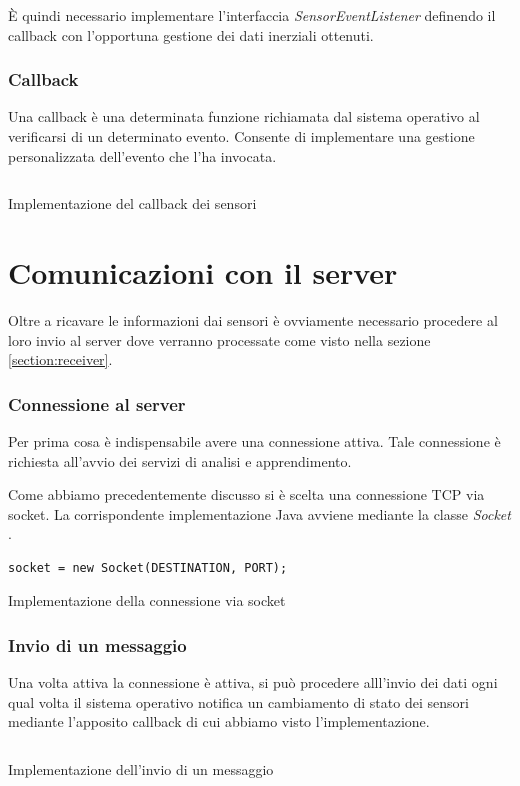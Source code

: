 È quindi necessario implementare l'interfaccia \textit{SensorEventListener} \cite{sensor_listener} definendo il 
callback con l'opportuna gestione dei dati inerziali ottenuti.

\subsubsection{Callback}
Una callback è una determinata funzione richiamata dal sistema operativo al verificarsi di un determinato evento.
Consente di implementare una gestione personalizzata dell'evento che l'ha invocata.

\begin{listing}[H] 
    \inputminted[frame=single,framesep=10pt]{java}{assets/snippets/app/sensors.java}
    \caption{Implementazione del callback dei sensori}
    \label{listing:sensor-event-callback}
\end{listing}

\newpage
\section{Comunicazioni con il server}
Oltre a ricavare le informazioni dai sensori è ovviamente necessario procedere al loro invio al server  
dove verranno processate come visto nella sezione \ref{section:receiver}.
\subsubsection{Connessione al server}
Per prima cosa è indispensabile avere una connessione attiva. Tale connessione è richiesta all'avvio dei servizi di 
analisi e apprendimento.

Come abbiamo precedentemente discusso si è scelta una connessione TCP via socket. La corrispondente implementazione Java
avviene mediante la classe \textit{Socket} \cite{socket}.
\begin{listing}[H] 
    \begin{verbatim}
socket = new Socket(DESTINATION, PORT);
    \end{verbatim}
    \caption{Implementazione della connessione via socket}
\end{listing}

\subsubsection{Invio di un messaggio}
Una volta attiva la connessione è attiva, si può procedere alll'invio dei dati ogni qual volta il sistema 
operativo notifica un cambiamento di stato dei sensori mediante l'apposito callback 
di cui abbiamo visto l'implementazione.
\begin{listing}[H] 
    \inputminted[frame=single,framesep=10pt]{java}{assets/snippets/app/connection/send.java}
    \caption{Implementazione dell'invio di un messaggio}
\end{listing}

